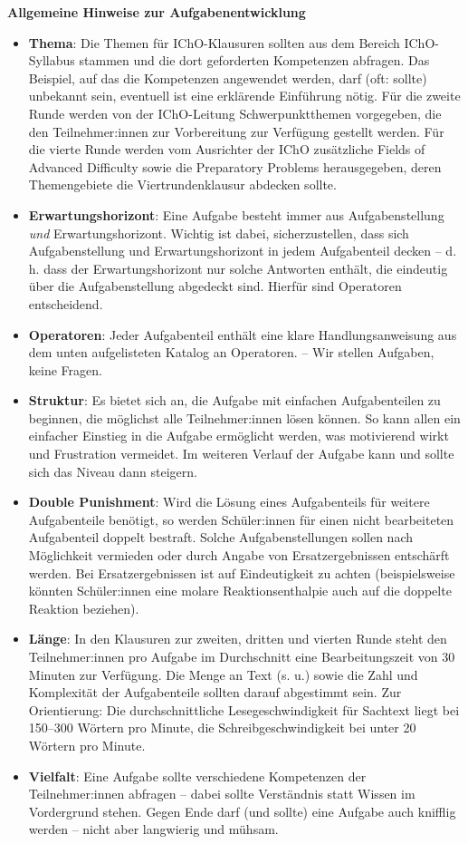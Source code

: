 \documentclass[./main.tex]{subfiles}
\begin{document}
\newpage
{\centering\textbf{Allgemeine Hinweise zur Aufgabenentwicklung}}
\begin{itemize}
    \item \textbf{Thema}: Die Themen f\"ur IChO-Klausuren sollten aus dem Bereich IChO-Syllabus stammen und die dort geforderten Kompetenzen abfragen. Das Beispiel, auf das die Kompetenzen angewendet werden, darf (oft: sollte) unbekannt sein, eventuell ist eine erkl\"arende Einf\"uhrung n\"otig. F\"ur die zweite Runde werden von der IChO-Leitung Schwerpunktthemen vorgegeben, die den Teilnehmer:innen zur Vorbereitung zur Verf\"ugung gestellt werden. F\"ur die vierte Runde werden vom Ausrichter der IChO zus\"atzliche \glqq{}Fields of Advanced Difficulty\grqq{} sowie die \glqq{}Preparatory Problems\grqq{} herausgegeben, deren Themengebiete die Viertrundenklausur abdecken sollte. 
    \item \textbf{Erwartungshorizont}: Eine Aufgabe besteht immer aus Aufgabenstellung \textit{und} Erwartungshorizont. Wichtig ist dabei, sicherzustellen, dass sich Aufgabenstellung und Erwartungshorizont in jedem Aufgabenteil decken -- d. h. dass der Erwartungshorizont nur solche Antworten enth\"alt, die eindeutig \"uber die Aufgabenstellung abgedeckt sind. Hierf\"ur sind Operatoren entscheidend. 
    \item \textbf{Operatoren}: Jeder Aufgabenteil enth\"alt eine klare Handlungsanweisung aus dem unten aufgelisteten Katalog an Operatoren. -- \glqq{}Wir stellen Aufgaben, keine Fragen.\grqq{}
    \item \textbf{Struktur}: Es bietet sich an, die Aufgabe mit einfachen Aufgabenteilen zu beginnen, die m\"oglichst alle Teilnehmer:innen l\"osen k\"onnen. So kann allen ein einfacher Einstieg in die Aufgabe erm\"oglicht werden, was motivierend wirkt und Frustration vermeidet. Im weiteren Verlauf der Aufgabe kann und sollte sich das Niveau dann steigern. 
    \item \textbf{Double Punishment}: Wird die L\"osung eines Aufgabenteils f\"ur weitere Aufgabenteile ben\"otigt, so werden Sch\"uler:innen f\"ur einen nicht bearbeiteten Aufgabenteil doppelt bestraft. Solche Aufgabenstellungen sollen nach M\"oglichkeit vermieden oder durch Angabe von Ersatzergebnissen entsch\"arft werden. Bei Ersatzergebnissen ist auf Eindeutigkeit zu achten (beispielsweise k\"onnten Sch\"uler:innen eine molare Reaktionsenthalpie auch auf die doppelte Reaktion beziehen).
    \item \textbf{L\"ange}: In den Klausuren zur zweiten, dritten und vierten Runde steht den Teilnehmer:innen pro Aufgabe im Durchschnitt eine Bearbeitungszeit von 30 Minuten zur Verf\"ugung. Die Menge an Text (s. u.) sowie die Zahl und Komplexit\"at der Aufgabenteile sollten darauf abgestimmt sein. Zur Orientierung: Die durchschnittliche Lesegeschwindigkeit f\"ur Sachtext liegt bei 150--300 W\"ortern pro Minute, die Schreibgeschwindigkeit bei unter 20 W\"ortern pro Minute.
    \item \textbf{Vielfalt}: Eine Aufgabe sollte verschiedene Kompetenzen der Teilnehmer:innen abfragen -- dabei sollte Verst\"andnis statt Wissen im Vordergrund stehen. Gegen Ende darf (und sollte) eine Aufgabe auch knifflig werden -- nicht aber langwierig und m\"uhsam. 
\end{itemize}
\end{document}
